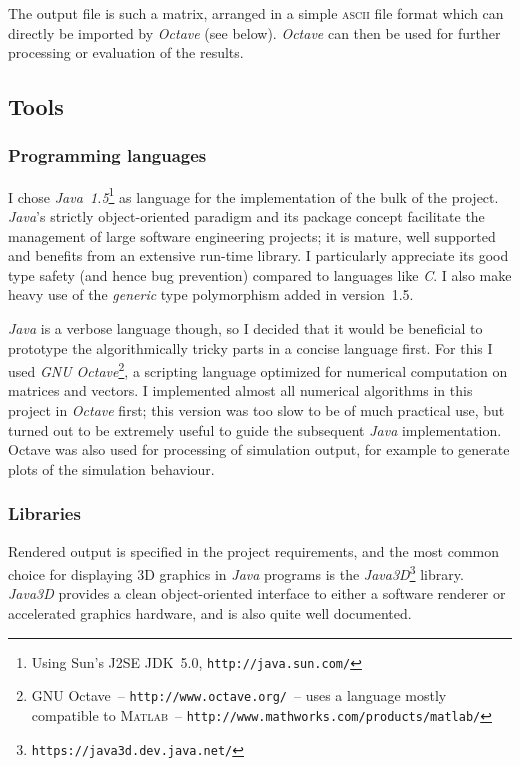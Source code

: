The output file is such a matrix, arranged in a simple \textsc{ascii} file format which can
directly be imported by \textsl{Octave} (see below). \textsl{Octave} can then be used for further
processing or evaluation of the results.

\subsection{Tools\label{softwareTools}}
\subsubsection{Programming languages}
I chose \textsl{Java~1.5}\footnote{Using Sun's J2SE JDK~5.0, \texttt{http://java.sun.com/}}
as language for the implementation of the bulk of the project. \textsl{Java}'s strictly
object-oriented paradigm and its package concept facilitate the management of large software
engineering projects; it is mature, well supported and benefits from an extensive run-time library.
I particularly appreciate its good type safety (and hence bug prevention) compared to languages
like \textsl{C}. I also make heavy use of the \emph{generic} type polymorphism added in
version~1.5.

\textsl{Java} is a verbose language though, so I decided that it would be beneficial to prototype
the algorithmically tricky parts in a concise language first. For this I used
\textsl{GNU Octave}\footnote{GNU Octave~-- \texttt{http://www.octave.org/}~-- uses a language
mostly compatible to \textsc{Matlab}~-- \texttt{http://www.mathworks.com/products/matlab/}},
a scripting language optimized for numerical computation on matrices and vectors. I implemented
almost all numerical algorithms in this project in \textsl{Octave} first; this version was too
slow to be of much practical use, but turned out to be extremely useful to guide the subsequent
\textsl{Java} implementation. Octave was also used for processing of simulation output, for
example to generate plots of the simulation behaviour.

\subsubsection{Libraries}
Rendered output is specified in the project requirements, and the most common choice for
displaying 3D graphics in \textsl{Java} programs is the
\textsl{Java3D}\footnote{\texttt{https://java3d.dev.java.net/}} library. \textsl{Java3D} provides
a clean object-oriented interface to either a software renderer or accelerated graphics hardware,
and is also quite well documented.

